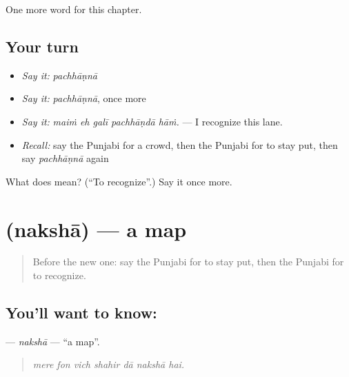 \begin{grammarlens}[title={What you've built}]
One more word for this chapter.
\end{grammarlens}

\subsection*{Your turn}
\begin{itemize}
\raggedright
  \item \emph{Say it:} \emph{pachhāṇnā}
  \item \emph{Say it:} \emph{pachhāṇnā}, once more
  \item \emph{Say it:} \emph{maiṁ eh galī pachhāṇdā hāṁ.} — I recognize this lane.
  \item \emph{Recall:} say the Punjabi for a crowd, then the Punjabi for to stay put, then say \emph{pachhāṇnā} again
\end{itemize}

\begin{tcolorbox}[breakable,colback=teal!4,colframe=teal!35!black,title={Before you move on}]
What does  mean? (\textquotedblleft{}To recognize\textquotedblright{}.) Say it once more.
\end{tcolorbox}
\section[\texorpdfstring{\pa{ਨਕਸ਼ਾ} (nakshā)}{ਨਕਸ਼ਾ (nakshā)}]{ (nakshā) — a map}

\label{lesson:PA-C269-naksha}



\begin{quote}
Before the new one: say the Punjabi for to stay put, then the Punjabi for to recognize.
\end{quote}

\subsection*{You'll want to know: }
\textbf{} — \emph{nakshā} — \textquotedblleft{}a map\textquotedblright{}.

\begin{quote}
      
\end{quote}

\begin{quote}
\emph{mere fon vich shahir dā nakshā hai.}
\end{quote}

